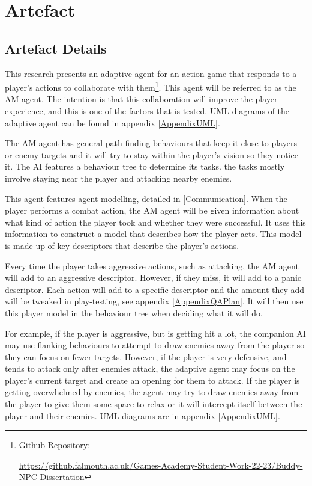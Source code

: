 \documentclass{IEEEtran}
\begin{document}
\section{Artefact}
\label{Artefact}

\subsection{Artefact Details}
\label{ArtefactDetails}

This research presents an adaptive agent for an action game that responds to a player's actions to collaborate with them\footnote{Github Repository:

\url{https://github.falmouth.ac.uk/Games-Academy-Student-Work-22-23/Buddy-NPC-Dissertation}}. This agent will be referred to as the AM agent. The intention is that this collaboration will improve the player experience, and this is one of the factors that is tested. UML diagrams of the adaptive agent can be found in appendix \ref{AppendixUML}.

The AM agent has general path-finding behaviours that keep it close to players or enemy targets and it will try to stay within the player's vision so they notice it. The AI features a behaviour tree to determine its tasks. the tasks mostly involve staying near the player and attacking nearby enemies.

This agent features agent modelling, detailed in \ref{Communication}. When the player performs a combat action, the AM agent will be given information about what kind of action the player took and whether they were successful. It uses this information to construct a model that describes how the player acts. This model is made up of key descriptors that describe the player's actions.

Every time the player takes aggressive actions, such as attacking, the AM agent will add to an aggressive descriptor. However, if they miss, it will add to a panic descriptor. Each action will add to a specific descriptor and the amount they add will be tweaked in play-testing, see appendix \ref{AppendixQAPlan}. It will then use this player model in the behaviour tree when deciding what it will do.

For example, if the player is aggressive, but is getting hit a lot, the companion AI may use flanking behaviours to attempt to draw enemies away from the player so they can focus on fewer targets. However, if the player is very defensive, and tends to attack only after enemies attack, the adaptive agent may focus on the player's current target and create an opening for them to attack. If the player is getting overwhelmed by enemies, the agent may try to draw enemies away from the player to give them some space to relax or it will intercept itself between the player and their enemies. UML diagrams are in appendix \ref{AppendixUML}.
\end{document}
